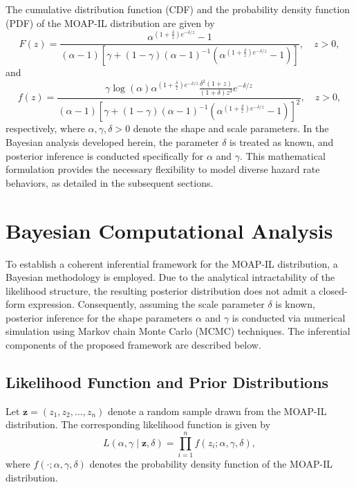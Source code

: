 \documentclass[twoside]{article}
\begin{document}
The cumulative distribution function (CDF) and the probability density function (PDF) of the MOAP-IL distribution are given by
\begin{equation}
F(z) = \frac{\alpha^{\left(1+\frac{\delta}{z}\right)e^{-\delta/z}}-1}{(\alpha-1)\left[\gamma + (1-\gamma)(\alpha-1)^{-1}\left(\alpha^{\left(1+\frac{\delta}{z}\right)e^{-\delta/z}}-1\right)\right]}, \quad z>0,
\end{equation}
and
\begin{equation}
f(z) = \frac{\gamma \log(\alpha) \alpha^{\left(1+\frac{\delta}{z}\right)e^{-\delta/z}} \frac{\delta^2 (1+z)}{(1+\delta) z^3} e^{-\delta/z}}{(\alpha-1)\left[\gamma + (1-\gamma)(\alpha-1)^{-1}\left(\alpha^{\left(1+\frac{\delta}{z}\right)e^{-\delta/z}}-1\right)\right]^2}, \quad z>0,
\end{equation}
respectively, where $\alpha, \gamma, \delta > 0$ denote the shape and scale parameters. In the Bayesian analysis developed herein, the parameter $\delta$ is treated as known, and posterior inference is conducted specifically for $\alpha$ and $\gamma$. This mathematical formulation provides the necessary flexibility to model diverse hazard rate behaviors, as detailed in the subsequent sections.

\section{Bayesian Computational Analysis}

To establish a coherent inferential framework for the MOAP-IL distribution, a Bayesian methodology is employed. Due to the analytical intractability of the likelihood structure, the resulting posterior distribution does not admit a closed-form expression. Consequently, assuming the scale parameter $\delta$ is known, posterior inference for the shape parameters $\alpha$ and $\gamma$ is conducted via numerical simulation using Markov chain Monte Carlo (MCMC) techniques. The inferential components of the proposed framework are described below.

\subsection{Likelihood Function and Prior Distributions}

Let $\mathbf{z} = (z_1, z_2, \dots, z_n)$ denote a random sample drawn from the MOAP-IL distribution. The corresponding likelihood function is given by
\begin{equation}
L(\alpha, \gamma \mid \mathbf{z}, \delta) = \prod_{i=1}^{n} f(z_i; \alpha, \gamma, \delta),
\end{equation}
where $f(\cdot; \alpha, \gamma, \delta)$ denotes the probability density function of the MOAP-IL distribution.
\end{document}
